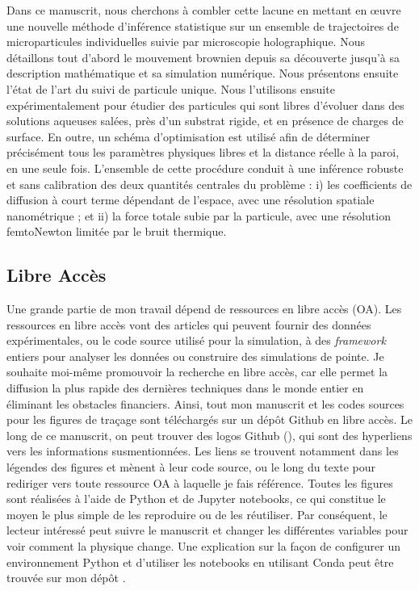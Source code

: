 Dans ce manuscrit, nous cherchons à combler cette lacune en mettant en œuvre une nouvelle méthode d'inférence statistique sur un ensemble de trajectoires de microparticules individuelles suivie par microscopie holographique. Nous détaillons tout d'abord le mouvement brownien depuis sa découverte jusqu'à sa description mathématique et sa simulation numérique. Nous présentons ensuite l'état de l'art du suivi de particule unique. Nous l'utilisons ensuite expérimentalement pour étudier des particules qui sont libres d'évoluer dans des solutions aqueuses salées, près d'un substrat rigide, et en présence de charges de surface. En outre, un schéma d'optimisation est utilisé afin de déterminer précisément tous les paramètres physiques libres et la distance réelle à la paroi, en une seule fois. L'ensemble de cette procédure conduit à une inférence robuste et sans calibration des deux quantités centrales du problème : i) les coefficients de diffusion à court terme dépendant de l'espace, avec une résolution spatiale nanométrique ; et ii) la force totale subie par la particule, avec une résolution femtoNewton limitée par le bruit thermique. 



\subsection{Libre Accès}

Une grande partie de mon travail dépend de ressources en libre accès (OA). Les ressources en libre accès vont des articles qui peuvent fournir des données expérimentales, ou le code source utilisé pour la simulation, à des \textit{framework} entiers pour analyser les données ou construire des simulations de pointe. Je souhaite moi-même promouvoir la recherche en libre accès, car elle permet la diffusion la plus rapide des dernières techniques dans le monde entier en éliminant les obstacles financiers. Ainsi, tout mon manuscrit et les codes sources pour les figures de traçage sont téléchargés sur un dépôt Github en libre accès. Le long de ce manuscrit, on peut trouver des logos Github (\href{https://github.com/eXpensia/Ma-these/}{\faGithub}), qui sont des hyperliens vers les informations susmentionnées. Les liens se trouvent notamment dans les légendes des figures et mènent à leur code source, ou le long du texte pour rediriger vers toute ressource OA à laquelle je fais référence. Toutes les figures sont réalisées à l'aide de Python et de Jupyter notebooks, ce qui constitue le moyen le plus simple de les reproduire ou de les réutiliser. Par conséquent, le lecteur intéressé peut suivre le manuscrit et changer les différentes variables pour voir comment la physique change.  Une explication sur la façon de configurer un environnement Python et d'utiliser les notebooks en utilisant Conda peut être trouvée sur mon dépôt \href{https://github.com/eXpensia/Ma-these/}{\faGithub}.




